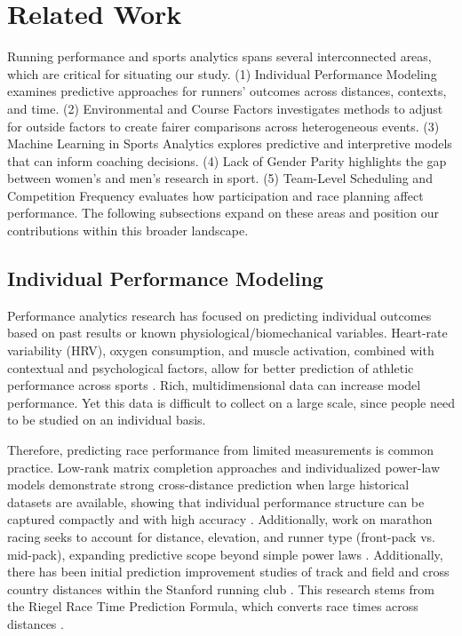 \documentclass[suppldata]{interact}
\theoremstyle{plain}%
\theoremstyle{definition}
\theoremstyle{remark}
\begin{document}
\section{Related Work}
Running performance and sports analytics spans several interconnected areas, which are critical for situating our study. (1) Individual Performance Modeling examines predictive approaches for runners’ outcomes across distances, contexts, and time. (2) Environmental and Course Factors investigates methods to adjust for outside factors to create fairer comparisons across heterogeneous events. (3) Machine Learning in Sports Analytics explores predictive and interpretive models that can inform coaching decisions. (4) Lack of Gender Parity highlights the gap between women's and men's research in sport. (5) Team-Level Scheduling and Competition Frequency evaluates how participation and race planning affect performance. The following subsections expand on these areas and position our contributions within this broader landscape.

\subsection{Individual Performance Modeling}
Performance analytics research has focused on predicting individual outcomes based on past results or known physiological/biomechanical variables. Heart-rate variability (HRV), oxygen consumption, and muscle activation, combined with contextual and psychological factors, allow for better prediction of athletic performance across sports \cite{jianjun2025predictive}.  Rich, multidimensional data can increase model performance. Yet this data is difficult to collect on a large scale, since people need to be studied on an individual basis. 

Therefore, predicting race performance from limited measurements is common practice. Low-rank matrix completion approaches and individualized power-law models demonstrate strong cross-distance prediction when large historical datasets are available, showing that individual performance structure can be captured compactly and with high accuracy \cite{blythe2016prediction}. Additionally, work on marathon racing seeks to account for distance, elevation, and runner type (front-pack vs. mid-pack), expanding predictive scope beyond simple power laws \cite{dash2024win}.  Additionally, there has been initial prediction improvement studies of track and field and cross country distances within the Stanford running club \cite{millettpredicting}.  This research stems from the Riegel Race Time Prediction Formula, which converts race times across distances \cite{riegel1981athletic}.
\end{document}
